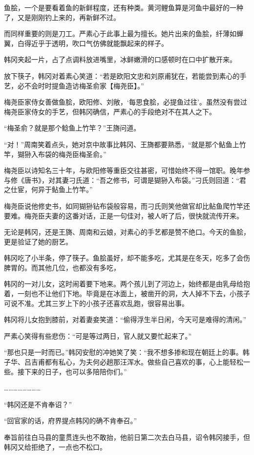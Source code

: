 鱼脍，一个是要看着鱼的新鲜程度，还有种类。黄河鲤鱼算是河鱼中最好的一种了，又是刚刚钓上来的，再新鲜不过。

而同样重要的则是刀工。严素心于此事上最为擅长。她片出来的鱼脍，纤薄如蝉翼，白得近乎于透明，吹口气仿佛就能飘起来的样子。

韩冈夹起一片，占了点调料放进嘴里，冰鲜嫩滑的口感顿时在口中扩散开来。

放下筷子，韩冈对着素心笑道：“若是欧阳文忠和刘原甫犹在，若能尝到素心的手艺，必不会时时提鱼造访梅圣俞家【梅尧臣】。”

梅尧臣家侍女善做鱼脍，欧阳修、刘敞，‘每思食脍，必提鱼过往’。虽然没有尝过梅尧臣家侍女的手艺，但韩冈确信，严素心的手段绝对不在其人之下。

“梅圣俞？就是那个鲶鱼上竹竿？”王旖问道。

“对！”周南笑着点头，她对京中故事比韩冈、王旖都要熟悉，“就是那个鲇鱼上竹竿，猢狲入布袋的梅尧臣梅圣俞。”

梅尧臣以诗知名三十年，与欧阳修等重臣交往甚密，可惜始终不得一馆职。晚年参与修《唐书》，对其妻刁氏道：“吾之修书，可谓是猢狲入布袋。”刁氏则回道：“君之仕宦，何异于鲇鱼上竹竿。”

梅尧臣说他修史书，如同猢狲钻布袋般容易，而刁氏则笑他做官却比鲇鱼爬竹竿还要难。梅尧臣夫妻的这番对话，正是一句佳对，被人听了后，很快就流传开来。

无论是韩冈，还是王旖、周南和云娘，对素心的手艺都是赞不绝口。今天的鱼脍，更是验证了她的厨艺。

韩冈吃了小半条，停了筷子。鱼脍虽好，却不能多吃，尤其是在冬天，吃多了会伤脾胃的。而其他几位，也都没有多吃，

韩冈的一对儿女，这时闹着要下地来。两个孩儿到了河边上，始终都是由乳母给抱着，一刻也不让他们下地。毕竟是在冰面上，被凿开的洞，大人掉不下去，小孩子可说不准。尤其三岁上下的小孩子还喜欢乱跑，很容易出事。

韩冈将儿女抱到膝前，对着妻妾笑道：“偷得浮生半日闲，今天可是难得的清闲。”

严素心笑得有些悲伤：“可是等过两日，官人就又要忙起来了。”

“那也只是一时而已。”韩冈安慰的冲她笑了笑：“我不想多掺和现在朝廷上的事。韩子华、吕吉甫都有私心，为夫何必趟那汪浑水。做些自己喜欢的事，心上能轻松一些。接下来的日子，也可以多陪陪你们。”

……………………

“韩冈还是不肯奉诏？”

“回官家的话，府界提点韩冈的确不肯奉召。”

奉旨前往白马县的童贯连头也不敢抬，他前日第二次去白马县，诏令韩冈接手，但韩冈又给拒绝了，一点也不松口。


